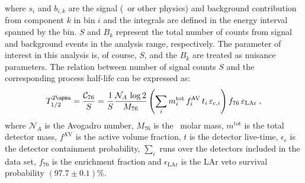 where $s_i$ and $b_{i,k}$ are the signal (\nnbb\ or other physics) and background
contribution from component $k$ in bin $i$ and the integrals are defined in the energy
interval spanned by the bin. $S$ and $B_k$ represent the total number of counts from
signal and background events in the analysis range, respectively. The parameter of
interest in this analysis is, of course, $S$, and the $B_k$ are treated as nuisance
parameters. The relation between number of signal counts $S$ and the corresponding process
half-life can be expressed as:
\begin{equation}\label{eq:2nbb-ana:halflife}
  \thalftwoM = \frac{\mathcal{C}_{76}}{S} = \frac{1}{S} \frac{\mathcal{N}_A\, \log2}{M_{76}}
               \left( \sum_i m^\text{tot}_i \, f^\text{AV}_i \, t_i \, \epsilon_{\text{c},i} \right)
               f_{76} \, \epsilon_\text{LAr} \;,
\end{equation}
where $\mathcal{N}_A$ is the Avogadro number, $M_{76}$ is the \gesix\ molar mass,
$m^\text{tot}$ is the total detector mass, $f^\text{AV}$ is the active volume fraction,
$t$ is the detector live-time, $\epsilon_\text{c}$ is the detector containment
probability, $\sum_i$ runs over the detectors included in the data set, $f_{76}$ is the
enrichment fraction and $\epsilon_\text{LAr}$ is the LAr veto survival probability $(97.7
\pm 0.1)$\%.

